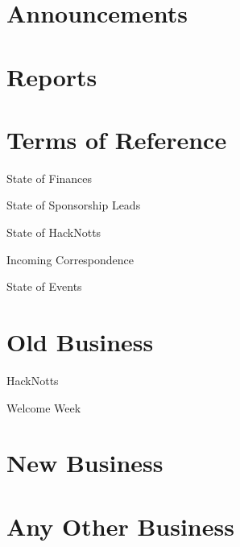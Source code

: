 \documentclass[11pt,hacksoc,agenda]{meetingmins}
\begin{document}
\maketitle

\section{Announcements}
\begin{items}
\item
\end{items}

\section{Reports}

\section{Terms of Reference}
\begin{items}
\item {State of Finances}
\item {State of Sponsorship Leads}
\item {State of HackNotts}
\item {Incoming Correspondence}
\item {State of Events}
\end{items}

\section{Old Business}
\begin{items}
\item{HackNotts}
\item{Welcome Week}
\end{items}

\section{New Business}
\begin{items}
\item{}
\end{items}

\section{Any Other Business}

\vspace{1em}
\end{document}
